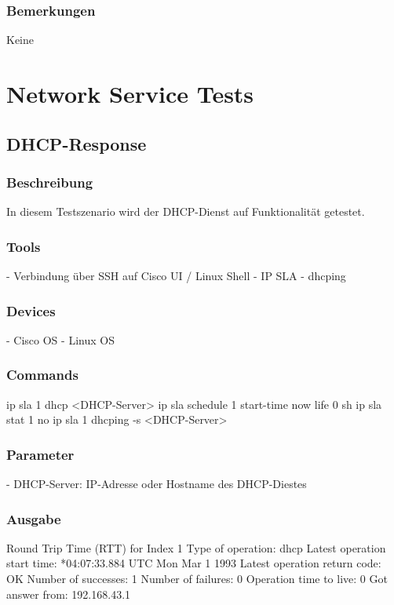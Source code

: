 \documentclass[a4,12pt]{scrartcl}
\begin{document}
\subsubsection{Bemerkungen}
Keine

\newpage
\section{Network Service Tests}
\subsection{DHCP-Response}
\subsubsection{Beschreibung}
In diesem Testszenario wird der DHCP-Dienst auf Funktionalität getestet.
\subsubsection{Tools}
- Verbindung über SSH auf Cisco UI / Linux Shell\newline
- IP SLA\newline
- dhcping\newline
\subsubsection{Devices}
- Cisco OS\newline
- Linux OS\newline
\subsubsection{Commands}
ip sla 1\newline
dhcp <DHCP-Server>\newline
ip sla schedule 1 start-time now life 0\newline
sh ip sla stat 1\newline
no ip sla 1\newline
{}
dhcping -s <DHCP-Server>
\subsubsection{Parameter}
- DHCP-Server: IP-Adresse oder Hostname des DHCP-Diestes
\subsubsection{Ausgabe}
Round Trip Time (RTT) for Index 1\newline
Type of operation: dhcp\newline
Latest operation start time: *04:07:33.884 UTC Mon Mar 1 1993\newline
Latest operation return code: OK\newline
Number of successes: 1\newline
Number of failures: 0\newline
Operation time to live: 0\newline
{}
Got answer from: 192.168.43.1
\end{document}
